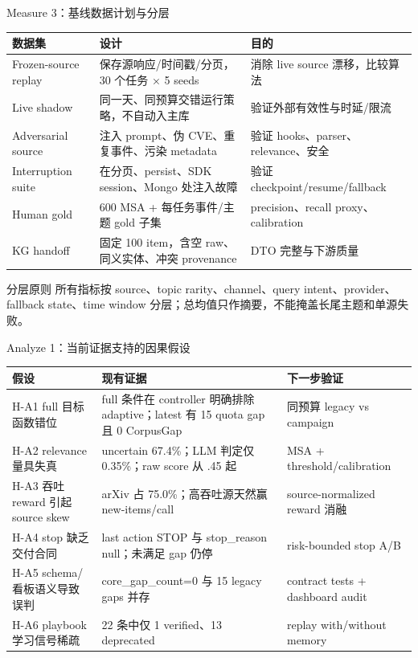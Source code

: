 \begin{frame}{Measure 3：基线数据计划与分层}
\scriptsize
\begin{tabularx}{\textwidth}{p{} X X}
\toprule
数据集 & 设计 & 目的 \\
\midrule
Frozen-source replay & 保存源响应/时间戳/分页，30 个任务 × 5 seeds & 消除 live source 漂移，比较算法 \\
Live shadow & 同一天、同预算交错运行策略，不自动入主库 & 验证外部有效性与时延/限流 \\
Adversarial source & 注入 prompt、伪 CVE、重复事件、污染 metadata & 验证 hooks、parser、relevance、安全 \\
Interruption suite & 在分页、persist、SDK session、Mongo 处注入故障 & 验证 checkpoint/resume/fallback \\
Human gold & 600 MSA + 每任务事件/主题 gold 子集 & precision、recall proxy、calibration \\
KG handoff & 固定 100 item，含空 raw、同义实体、冲突 provenance & DTO 完整与下游质量 \\
\bottomrule
\end{tabularx}

\vspace{0.2em}
\begin{block}{分层原则}
所有指标按 source、topic rarity、channel、query intent、provider、fallback state、time window 分层；总均值只作摘要，不能掩盖长尾主题和单源失败。
\end{block}
\end{frame}

\begin{frame}{Analyze 1：当前证据支持的因果假设}
\small
\begin{tabularx}{\textwidth}{p{} X p{}}
\toprule
假设 & 现有证据 & 下一步验证 \\
\midrule
H-A1 full 目标函数错位 & full 条件在 controller 明确排除 adaptive；latest 有 15 quota gap 且 0 CorpusGap & 同预算 legacy vs campaign \\
H-A2 relevance 量具失真 & uncertain 67.4\%；LLM 判定仅 0.35\%；raw score 从 .45 起 & MSA + threshold/calibration \\
H-A3 吞吐 reward 引起 source skew & arXiv 占 75.0\%；高吞吐源天然赢 new-items/call & source-normalized reward 消融 \\
H-A4 stop 缺乏交付合同 & last action STOP 与 stop\_reason null；未满足 gap 仍停 & risk-bounded stop A/B \\
H-A5 schema/看板语义导致误判 & core\_gap\_count=0 与 15 legacy gaps 并存 & contract tests + dashboard audit \\
H-A6 playbook 学习信号稀疏 & 22 条中仅 1 verified、13 deprecated & replay with/without memory \\
\bottomrule
\end{tabularx}
\end{frame}

